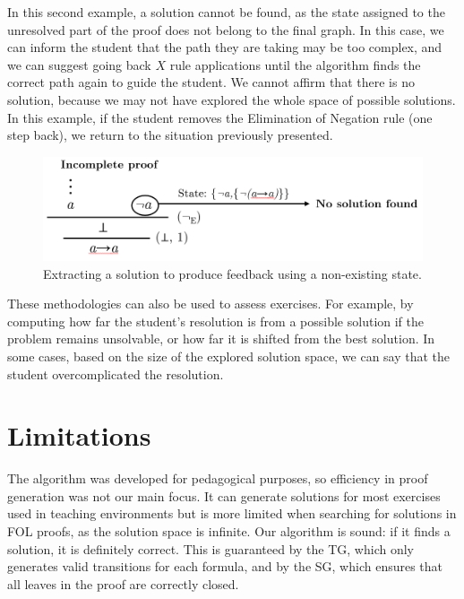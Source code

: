 \documentclass[runningheads]{llncs}
\begin{document}
In this second example, a solution cannot be found, as the state assigned to the unresolved part of the proof does not belong to the final graph. In this case, we can inform the student that the path they are taking may be too complex, and we can suggest going back \(X\) rule applications until the algorithm finds the correct path again to guide the student. We cannot affirm that there is no solution, because we may not have explored the whole space of possible solutions. In this example, if the student removes the Elimination of Negation rule (one step back), we return to the situation previously presented.

\vspace{-1em}
\begin{figure}[H]
    \centering
    \includegraphics[width=1\linewidth]{resources/trim-neg-feed.png}
    \caption{Extracting a solution to produce feedback using a non-existing state.}
    \label{fig:extract-solution2}
\end{figure}
\vspace{-2em}

These methodologies can also be used to assess exercises. For example, by computing how far the student’s resolution is from a possible solution if the problem remains unsolvable, or how far it is shifted from the best solution. In some cases, based on the size of the explored solution space, we can say that the student overcomplicated the resolution.

\section{Limitations}
The algorithm was developed for pedagogical purposes, so efficiency in proof generation was not our main focus. It can generate solutions for most exercises used in teaching environments but is more limited when searching for solutions in FOL proofs, as the solution space is infinite. Our algorithm is sound: if it finds a solution, it is definitely correct. This is guaranteed by the TG, which only generates valid transitions for each formula, and by the SG, which ensures that all leaves in the proof are correctly closed.
\end{document}
